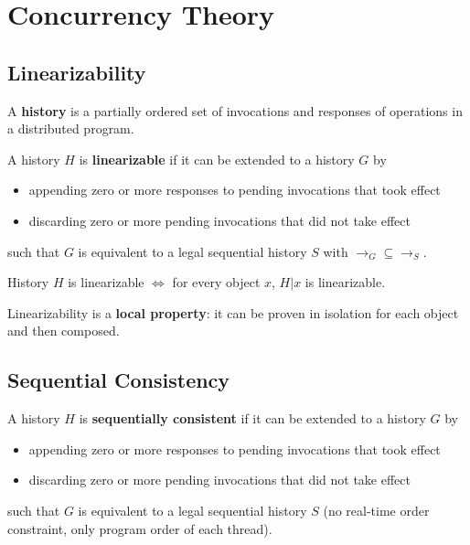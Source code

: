 \section{Concurrency Theory}

\subsection{Linearizability}

\begin{definition}
A \textbf{history} is a partially ordered set of invocations and responses of operations in a distributed program.
\end{definition}

\begin{definition}
A history $H$ is \textbf{linearizable} if it can be extended to a history $G$ by
\begin{itemize}
    \item appending zero or more responses to pending invocations that took effect
    \item discarding zero or more pending invocations that did not take effect
\end{itemize}
such that $G$ is equivalent to a legal sequential history $S$ with $\to_G \subseteq \to_S$.
\end{definition}

\begin{theorem}
History $H$ is linearizable $\iff$ for every object $x$, $H | x$ is linearizable.
\end{theorem}

\begin{remark}
Linearizability is a \textbf{local property}: it can be proven in isolation for each object and then composed.
\end{remark}

\subsection{Sequential Consistency}

\begin{definition}
A history $H$ is \textbf{sequentially consistent} if it can be extended to a history $G$ by
\begin{itemize}
    \item appending zero or more responses to pending invocations that took effect
    \item discarding zero or more pending invocations that did not take effect
\end{itemize}
such that $G$ is equivalent to a legal sequential history $S$ (no real-time order constraint, only program order of each thread).
\end{definition}

